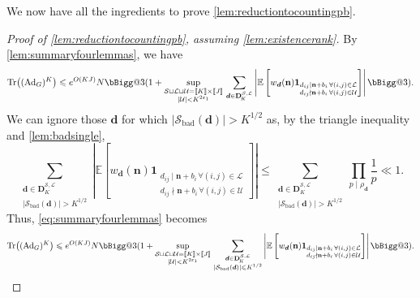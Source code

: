 \documentclass[11pt]{amsart}
\makeatletter
\theoremstyle{definition}
\renewcommand{\leq}{\leqslant}
\newcommand{\sinterval}[1]{[\![#1]\!] }
\newcommand{\abs}[1]{\left|#1\right|}
\newcommand{\ind}[1]{\mathbf{1}_{#1}}
\newcommand{\eps}{\varepsilon}
\newcommand{\E}{\mathbb{E}}
\newcommand{\Ad}{\mathrm{Ad}}
\newcommand{\Tr}{\mathrm{Tr}}
\renewcommand{\d}{\boldsymbol{d}}
\newcommand{\pcomp}[2]{d_{#1#2}}
\newcommand{\n}{\mathbf{n}}
\newcommand{\cstU}{2\eps_1}
\newcommand{\graph}{G}
\newcommand{\sommespart}{b}
\newcommand{\fprod}[1]{\rho_{#1}}
\newcommand{\pall}{\fprod{\d}}
\newcommand{\lit}{\mathcal{L}}
\newcommand{\unlit}{\mathcal{U}}
\newcommand{\s}{\mathcal{S}}
\newcommand{\fancyD}{\mathbf{D}}
\newcommand{\Dss}{\fancyD^{\s,\lit}_{\!\repK}}
\newcommand{\repR}{J}
\newcommand{\repK}{K}
\newcommand{\newK}{\sinterval{K}}
\newcommand{\newR}{\sinterval{J}}
\newcommand{\kbad}{\s_{\mathrm{bad}}(\d)}
\newcommand{\newerKR}{\newK\times\newR}
\newcommand{\vast}{\bBigg@{3}}
\makeatother
\begin{document}
We now have all the ingredients to prove \cref{lem:reductiontocountingpb}.


\begin{proof}[Proof of \cref{lem:reductiontocountingpb}, assuming \cref{lem:existencerank}]
By \cref{lem:summaryfourlemmas}, we have
\begin{equation}
\label{eq:summaryfourlemmas}
	\Tr \big((\Ad_{\graph})^{\repK}\big) \leq e^{O(\repK\repR)}N \vast( 1+ \sup_{\substack{\s\sqcup \lit\sqcup \unlit = \newerKR\\ |\unlit| <\repK^{\cstU}}}\, \sum_{\d\in \Dss}\abs{ \E \left[w_{\d}(\n) \ind{\substack{\pcomp{i}{j}\mid \n+\sommespart_i \, \forall (i,j)\in \lit \\ \pcomp{i}{j}\nmid \n+\sommespart_i \, \forall (i,j)\in \unlit}} \right] }\vast).
\end{equation}
We can ignore those $\d$ for which $|{\kbad}| >\repK^{1/2}$ as, by the triangle inequality and \cref{lem:badsingle},
\begin{equation*}
\sum_{\substack{\d\in \Dss\\ |{\kbad}| >\repK^{1/2}}}\abs{\E \left[w_{\d}(\n) \ind{\substack{\pcomp{i}{j}\mid \n+\sommespart_i \, \forall (i,j)\in \lit \\ \pcomp{i}{j}\nmid \n+\sommespart_i \, \forall (i,j)\in \unlit}} \right] }\leq \sum_{\substack{\d\in \Dss\\ |{\kbad}| >\repK^{1/2}}} \prod_{p\mid \pall} \frac{1}{p} \ll 1.
\end{equation*}
Thus, \cref{eq:summaryfourlemmas} becomes
\begin{equation}
\label{eq:aftersbad}
\Tr \big((\Ad_{\graph})^{\repK}\big) \leq e^{O(\repK\repR)}N \vast( 1+ \sup_{\substack{\s\sqcup \lit\sqcup \unlit = \newerKR\\ |\unlit| <\repK^{\cstU}}}\, \sum_{\substack{\d\in \Dss\\ |{\kbad}| \leq \repK^{1/2}}}\abs{ \E \left[w_{\d}(\n) \ind{\substack{\pcomp{i}{j}\mid \n+\sommespart_i \, \forall (i,j)\in \lit \\ \pcomp{i}{j}\nmid \n+\sommespart_i \, \forall (i,j)\in \unlit}} \right] } \vast).
\end{equation}


\end{proof}
\end{document}
